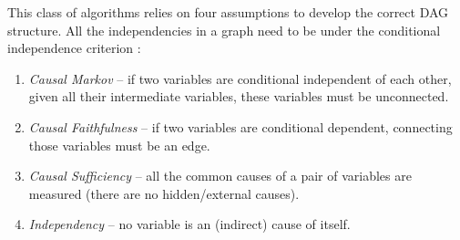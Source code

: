 This class of algorithms relies on four assumptions to develop the correct DAG structure. All the independencies in a graph need to be under the conditional independence criterion \cite{nogueira2021causal}:
\begin{enumerate}
\item \textit{Causal Markov} – if two variables are conditional independent of each other, given all their intermediate variables, these variables must be unconnected.
\item \textit{Causal Faithfulness} – if two variables are conditional dependent, connecting those variables must be an edge.
\item \textit{Causal Sufficiency} – all the common causes of a pair of variables are measured (there are no hidden/external causes).
\item \textit{Independency} –  no variable is an (indirect) cause of itself.
\end{enumerate}


